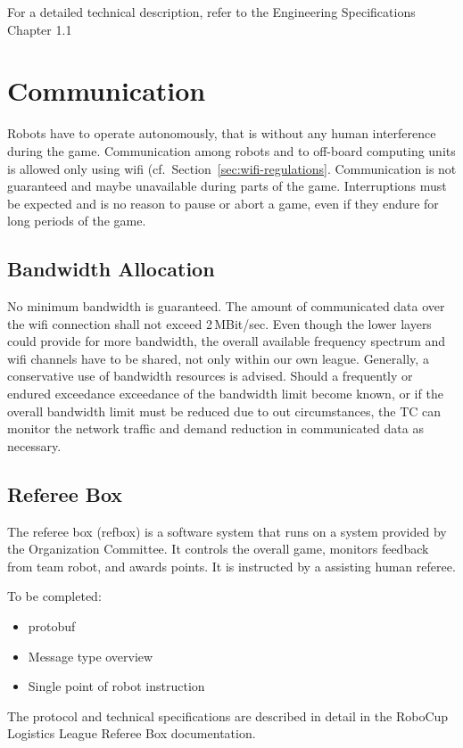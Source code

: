 \documentclass[12pt,twoside]{article}
\newcommand{\refsec}[1]{Section~\ref{#1}}
\begin{document}
For a detailed technical description, refer to the Engineering
Specifications Chapter 1.1 

\section{Communication}
Robots have to operate autonomously, that is without any human
interference during the game. Communication among robots and to
off-board computing units is allowed only using wifi
(cf.~\refsec{sec:wifi-regulations}. Communication is not guaranteed
and maybe unavailable during parts of the game. Interruptions must be
expected and is no reason to pause or abort a game, even if they
endure for long periods of the game.

\subsection{Bandwidth Allocation}
\label{sec:bandwidth}
No minimum bandwidth is guaranteed. The amount of communicated data
over the wifi connection shall not exceed 2\,MBit/sec. Even though the
lower layers could provide for more bandwidth, the overall available
frequency spectrum and wifi channels have to be shared, not only
within our own league. Generally, a conservative use of bandwidth
resources is advised. Should a frequently or endured exceedance
exceedance of the bandwidth limit become known, or if the overall
bandwidth limit must be reduced due to out circumstances, the TC can
monitor the network traffic and demand reduction in communicated
data as necessary.

\subsection{Referee Box}
\label{sec:refbox}
The referee box (refbox) is a software system that runs on a system
provided by the Organization Committee. It controls the overall game,
monitors feedback from team robot, and awards points. It is instructed
by a assisting human referee.

To be completed:
\begin{itemize}
\item protobuf
\item Message type overview
\item Single point of robot instruction
\end{itemize}

The protocol and technical specifications are described in detail in
the RoboCup Logistics League Referee Box documentation.
\end{document}
